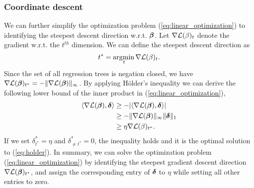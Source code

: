 \subsubsection{Coordinate descent}
We can further simplify the optimization problem (\ref{eq:linear_optimization}) to identifying the steepest descent direction w.r.t. $\boldsymbol{\beta}$. Let $\nabla {\cal L}(\beta)_t$ denote the gradient w.r.t. the $t^{th}$ dimension. We can define the steepest descent direction as 
\begin{equation}
	t^* = \arg\!\min_{\hspace{-3ex}t} \nabla {\cal L}(\beta)_t. \label{eq:mint}
\end{equation}
Since the set of all regression trees is negation closed, we have $\nabla{\cal L}(\boldsymbol{\beta})_{t^*}=-\|  \nabla{\cal L}(\boldsymbol{\beta}) \|_{\infty}$. By applying H\"older's inequality we can derive the following lower bound of the inner product in (\ref{eq:linear_optimization}),
\begin{align}
	\langle \nabla{\cal L}(\boldsymbol{\beta}), \boldsymbol{\delta} \rangle & \ge - | \langle \nabla{\cal L}(\boldsymbol{\beta}), \boldsymbol{\delta} \rangle | \nonumber \\
								& \ge - \|  \nabla{\cal L}(\boldsymbol{\beta}) \|_{\infty}\|  \boldsymbol{\delta}  \|_{1} \nonumber \\
								& \ge  \eta\nabla {\cal L}(\beta)_{t^*} .	\label{eq:holder}
\end{align}
If we set $\delta^*_{t^*}\!=\!\eta$ and $\delta^*_{\neq t^*}\!=\!0$, the inequality holds and it is the optimal solution to (\ref{eq:holder}). In summary, we can solve the optimization problem (\ref{eq:linear_optimization}) by identifying the steepest gradient descent direction $\nabla{\cal L}(\boldsymbol{\beta})_{t^*}$, and assign the corresponding entry of $\boldsymbol{\delta}$ to $\eta$ while setting all other entries to zero.

